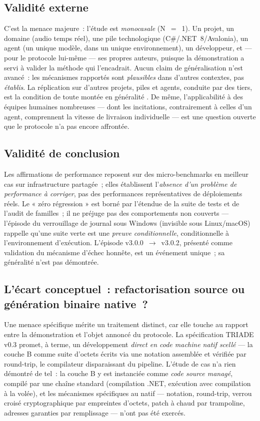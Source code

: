 \subsection{Validité externe}\label{sec:externe}

C’est la menace majeure~: l’étude est \emph{monocasale} (N~$=$~1). Un
projet, un domaine (audio temps réel), une pile technologique
(C\#/.NET~8/Avalonia), un agent (un unique modèle, dans un unique
environnement), un développeur, et — pour le protocole lui-même — ses
propres auteurs, puisque la démonstration a servi à valider la méthode
qui l’encadrait. Aucun claim de généralisation n’est avancé~: les
mécanismes rapportés sont \emph{plausibles} dans d’autres contextes, pas
\emph{établis}. La réplication sur d’autres projets, piles et agents,
conduite par des tiers, est la condition de toute montée en généralité
\cite{runeson2009}. De même, l’applicabilité à des équipes humaines
nombreuses — dont les incitations, contrairement à celles d’un agent,
comprennent la vitesse de livraison individuelle — est une question
ouverte que le protocole n’a pas encore affrontée.

\subsection{Validité de conclusion}\label{sec:conclusion-val}

Les affirmations de performance reposent sur des micro-benchmarks en
meilleur cas sur infrastructure partagée~; elles établissent l’\emph{absence
d’un problème de performance à corriger}, pas des performances
représentatives de déploiements réels. Le « zéro régression » est borné
par l’étendue de la suite de tests et de l’audit de familles~; il ne
préjuge pas des comportements non couverts — l’épisode du verrouillage de
journal sous Windows (invisible sous Linux/macOS) rappelle qu’une suite
verte est une \emph{preuve conditionnelle}, conditionnelle à
l’environnement d’exécution. L’épisode v3.0.0~$\to$~v3.0.2, présenté comme
validation du mécanisme d’échec honnête, est un événement unique~; sa
généralité n’est pas démontrée.

\subsection{L’écart conceptuel~: refactorisation source ou génération
binaire native~?}\label{sec:ecart}

Une menace spécifique mérite un traitement distinct, car elle touche au
rapport entre la démonstration et l’objet annoncé du protocole. La
spécification TRIADE v0.3 promet, à terme, un développement \emph{direct
en code machine natif scellé} — la couche B comme suite d’octets écrits
via une notation assemblée et vérifiée par round-trip, le compilateur
disparaissant du pipeline. L’étude de cas n’a rien démontré de tel~: la
couche B y est instanciée comme \emph{code source managé}, compilé par une
chaîne standard (compilation .NET, exécution avec compilation à la volée),
et les mécanismes spécifiques au natif — notation, round-trip, verrou
croisé cryptographique par empreintes d’octets, patch à chaud par
trampoline, adresses garanties par remplissage — n’ont pas été exercés.

